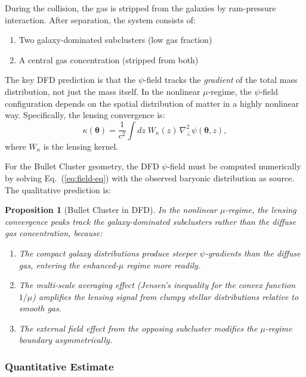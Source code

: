 \documentclass[aps,prd,twocolumn,superscriptaddress,nofootinbib]{revtex4-2}
\newtheorem{proposition}{Proposition}
\begin{document}
During the collision, the gas is stripped from the galaxies by
ram-pressure interaction. After separation, the system consists of:
\begin{enumerate}[nosep]
\item Two galaxy-dominated subclusters (low gas fraction)
\item A central gas concentration (stripped from both)
\end{enumerate}

The key DFD prediction is that the $\psi$-field tracks the
\textit{gradient} of the total mass distribution, not just the
mass itself. In the nonlinear $\mu$-regime, the $\psi$-field
configuration depends on the spatial distribution of matter in a
highly nonlinear way. Specifically, the lensing convergence is:
\begin{equation}\label{eq:convergence}
\kappa(\bm{\theta}) = \frac{1}{c^2}\int dz\;
W_\kappa(z)\,\nabla_\perp^2\psi(\bm{\theta},z),
\end{equation}
where $W_\kappa$ is the lensing kernel.

For the Bullet Cluster geometry, the DFD $\psi$-field must be
computed numerically by solving Eq.~(\ref{eq:field-eq}) with the
observed baryonic distribution as source. The qualitative prediction
is:

\begin{proposition}[Bullet Cluster in DFD]
In the nonlinear $\mu$-regime, the lensing convergence peaks track
the galaxy-dominated subclusters rather than the diffuse gas
concentration, because:
\begin{enumerate}[nosep]
\item The compact galaxy distributions produce steeper $\psi$-gradients
  than the diffuse gas, entering the enhanced-$\mu$ regime more readily.
\item The multi-scale averaging effect (Jensen's inequality for the
  convex function $1/\mu$) amplifies the lensing signal from clumpy
  stellar distributions relative to smooth gas.
\item The external field effect from the opposing subcluster modifies
  the $\mu$-regime boundary asymmetrically.
\end{enumerate}
\end{proposition}

\subsubsection{Quantitative Estimate}
\end{document}
